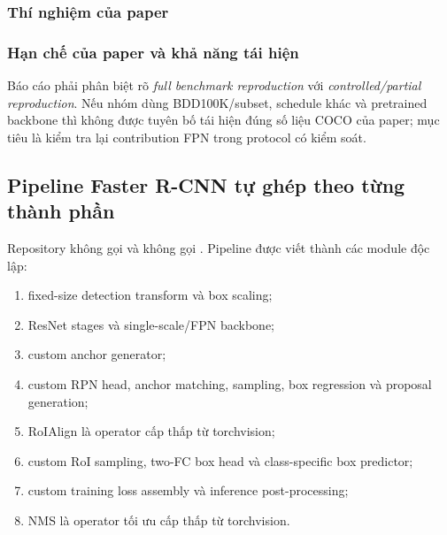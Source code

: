 \subsubsection{Thí nghiệm của paper}

\subsubsection{Hạn chế của paper và khả năng tái hiện}
Báo cáo phải phân biệt rõ \emph{full benchmark reproduction} với \emph{controlled/partial reproduction}. Nếu nhóm dùng BDD100K/subset, schedule khác và pretrained backbone thì không được tuyên bố tái hiện đúng số liệu COCO của paper; mục tiêu là kiểm tra lại contribution FPN trong protocol có kiểm soát.

\subsection{Pipeline Faster R-CNN tự ghép theo từng thành phần}
Repository không gọi  và không gọi . Pipeline được viết thành các module độc lập:
\begin{enumerate}
\item fixed-size detection transform và box scaling;
\item ResNet stages và single-scale/FPN backbone;
\item custom anchor generator;
\item custom RPN head, anchor matching, sampling, box regression và proposal generation;
\item RoIAlign là operator cấp thấp từ torchvision;
\item custom RoI sampling, two-FC box head và class-specific box predictor;
\item custom training loss assembly và inference post-processing;
\item NMS là operator tối ưu cấp thấp từ torchvision.
\end{enumerate}

